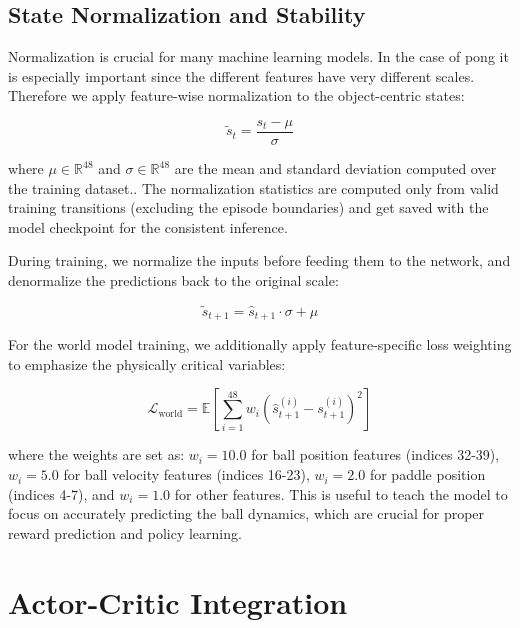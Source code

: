 \documentclass[
	english,
	ruledheaders=section,
	class=report,
	thesis={type=master},
	accentcolor=9c,
	custommargins=true,
	marginpar=false,
	parskip=half-,
	fontsize=11pt,
	pdfa=true,
]{tudapub}
\newcommand{\worldmodel}{world model}
\begin{document}
\subsection{State Normalization and Stability}
\label{subsec:normalization}

Normalization is crucial for many machine learning models. In the case of pong
it is especially important since the different features have very different
scales. Therefore we apply feature-wise normalization to the object-centric
states:

\begin{equation}
	\tilde{s}_t = \frac{s_t - \mu}{\sigma}
\end{equation}

where $\mu \in \mathbb{R}^{48}$ and $\sigma \in \mathbb{R}^{48}$ are the mean
and standard deviation computed over the training dataset.. The normalization
statistics are computed only from valid training transitions (excluding the
episode boundaries) and get saved with the model checkpoint for the consistent
inference.

During training, we normalize the inputs before feeding them to the network,
and denormalize the predictions back to the original scale:

\begin{equation}
	\tilde{s}_{t+1} = \hat{s}_{t+1} \cdot \sigma + \mu
\end{equation}

For the \worldmodel{} training, we additionally apply feature-specific loss
weighting to emphasize the physically critical variables:

\begin{equation}
	\mathcal{L}_{\text{world}} = \mathbb{E}\left[\sum_{i=1}^{48} w_i \left(\hat{s}_{t+1}^{(i)} - s_{t+1}^{(i)}\right)^2\right]
\end{equation}

where the weights are set as: $w_i = 10.0$ for ball position features (indices
32-39), $w_i = 5.0$ for ball velocity features (indices 16-23), $w_i = 2.0$ for
paddle position (indices 4-7), and $w_i = 1.0$ for other features. This is
useful to teach the model to focus on accurately predicting the ball dynamics,
which are crucial for proper reward prediction and policy learning.

\section{Actor-Critic Integration}
\label{sec:actor_critic}
\end{document}
